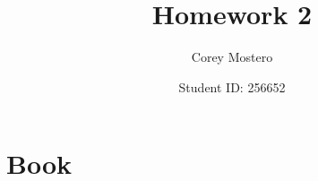 \documentclass{article}
\title{Homework 2}
\author{Corey Mostero}
\date{Student ID: 256652}
\begin{document}
\newcommand{\hr}{\par\noindent\rule{\textwidth}{0.4pt}}

\newcommand{\bc}[1]{
	\begin{equation*}
		\begin{boxed}
			{#1}
		\end{boxed}
	\end{equation*}
}

\maketitle
\newpage

\tableofcontents

\section{Book}
\end{document}
